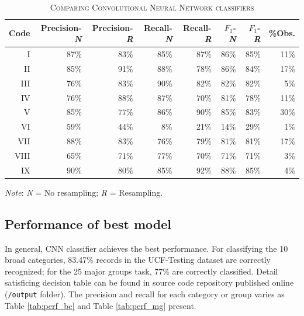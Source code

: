 \documentclass[11pt]{article}
\begin{document}
\begin{table}
\centering
\begin{threeparttable}
    \caption{\textsc{Comparing Convolutional Neural Network classifiers}} \label{tab:perf_compare}
    \begin{tabular}{r|r|r|r|r|r|r|r}
		\hline
			Code & Precision-\textit{N} & Precision-\textit{R} & Recall-\textit{N} & Recall-\textit{R} & $F_1$-\textit{N} & $F_1$-\textit{R} & \%Obs.\\
		\hline
			I & 87\% & 83\% & 85\% & 87\% & 86\% & 85\% & 11\% \\
			II & 85\% & 91\% & 88\% & 78\% & 86\% & 84\% & 17\% \\
			III & 76\% & 83\% & 90\% & 82\% & 82\% & 82\% & 5\% \\
			IV & 76\% & 88\% & 87\% & 70\% & 81\% & 78\% & 11\% \\
			V & 85\% & 77\% & 86\% & 90\% & 85\% & 83\% & 30\% \\
			VI & 59\% & 44\% & 8\% & 21\% & 14\% & 29\% & 1\% \\
			VII & 88\% & 83\% & 76\% & 79\% & 81\% & 81\% & 17\% \\
			VIII & 65\% & 71\% & 77\% & 70\% & 71\% & 71\% & 3\% \\
			IX & 90\% & 80\% & 85\% & 92\% & 88\% & 85\% & 4\% \\
    	 \hline
    \end{tabular}
\begin{tablenotes}
\footnotesize
\item \emph{Note}: \textit{N} = No resampling; \textit{R} = Resampling.
\end{tablenotes}
\end{threeparttable}
\end{table}



\subsection{Performance of best model}

In general, CNN classifier achieves the best performance. For classifying the 10 broad categories, 83.47\% records in the UCF-Testing dataset are correctly recognized; for the 25 major groups task, 77\% are correctly classified. Detail satisficing decision table can be found in source code repository published online (\texttt{/output} folder). The precision and recall for each category or group varies as Table \ref{tab:perf_bc} and Table \ref{tab:perf_mg} present. 
\end{document}
